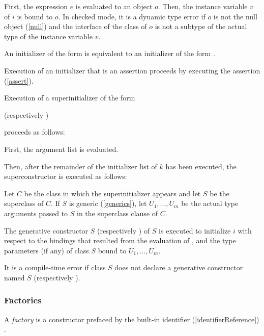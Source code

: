 \documentclass{article}
\begin{document}
\LMHash{}
First, the expression $e$ is evaluated to an object $o$.
Then, the instance variable $v$ of $i$ is bound to $o$.
In checked mode, it is a dynamic type error if $o$ is not the null object (\ref{null}) and the interface of the class of $o$ is not a subtype of the actual type of the instance variable $v$.

\LMHash{}
An initializer of the form  is equivalent to an initializer of the form .

\LMHash{}
Execution of an initializer that is an assertion proceeds by executing the assertion (\ref{assert}).

\LMHash{}
Execution of a superinitializer of the form


(respectively
)

proceeds as follows:

\LMHash{}
First, the argument list
is evaluated.

\LMHash{}
Then, after the remainder of the initializer list of $k$ has been executed,
the superconstructor is executed as follows:

\LMHash{}
Let $C$ be the class in which the superinitializer appears and let $S$ be the superclass of $C$.
If $S$ is generic (\ref{generics}), let $U_1, \ldots, U_m$ be the actual type arguments passed to $S$ in the superclass clause of $C$.

\LMHash{}
The generative constructor $S$ (respectively ) of $S$ is executed
to initialize $i$ with respect to the bindings that resulted from the evaluation of
,
and the type parameters (if any) of class $S$ bound to $U_1, \ldots, U_m$.

\LMHash{}
It is a compile-time error if class $S$ does not declare a generative constructor named $S$ (respectively ).


\subsubsection{Factories}

\LMHash{}
A {\em factory} is a constructor prefaced by the built-in identifier (\ref{identifierReference}) \FACTORY{}.
\end{document}
